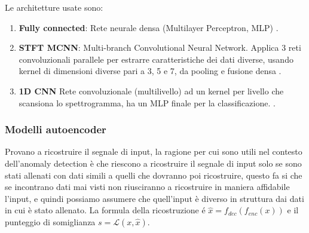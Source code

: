 Le architetture usate sono:
\begin{enumerate}
	\item \textbf{Fully connected}:
Rete neurale densa (Multilayer Perceptron, MLP) \cite{rumelhart1986learning}.


	\item \textbf{STFT MCNN}:
Multi-branch Convolutional Neural Network. Applica 3 reti convoluzionali parallele per estrarre caratteristiche dei dati diverse, usando kernel di dimensioni diverse pari a 3, 5 e 7, da pooling e fusione densa \cite{zhang2016mcnn}.


	\item \textbf{1D CNN}
	Rete convoluzionale (multilivello) ad un kernel per livello che scansiona lo spettrogramma, ha un MLP finale per la classificazione.
\cite{kiranyaz20151dcnn}.
\end{enumerate}
\subsubsection{Modelli autoencoder}
Provano a ricostruire il segnale di input, la ragione per cui sono utili nel contesto dell'anomaly detection è che riescono a ricostruire il segnale di input solo se sono stati allenati con dati simili a quelli che dovranno poi ricostruire, questo fa si che se incontrano dati mai visti non riusciranno a ricostruire in maniera affidabile l'input, e quindi possiamo assumere che quell'input è diverso in struttura dai dati in cui è stato allenato.
La formula della ricostruzione é $\hat{x} = f_{dec}(f_{enc}(x))$ e il punteggio di somiglianza $s = \mathcal{L}(x, \hat{x})$.




